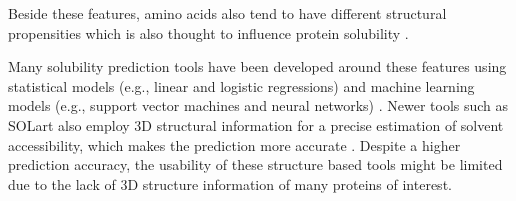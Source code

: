 Beside these features, amino acids also tend to have different structural propensities which is also thought to influence protein solubility \cite{Idicula-Thomas2005-qw, Huang2012-ft}.


Many solubility prediction tools have been developed around these features using statistical models (e.g., linear and logistic regressions) and machine learning models (e.g., support vector machines and neural networks) \cite{Hirose2013-nq, Habibi2014-jq, Hebditch2017-bg, Sormanni2017-lo, Heckmann2018-wb, Wu2019-nz, Yang2019-kd}. Newer tools such as SOLart also employ 3D structural information for a precise estimation of solvent accessibility, which makes the prediction more accurate \cite{hou2020solart}. Despite a higher prediction accuracy, the usability of these structure based tools might be limited due to the lack of 3D structure information of many proteins of interest.



